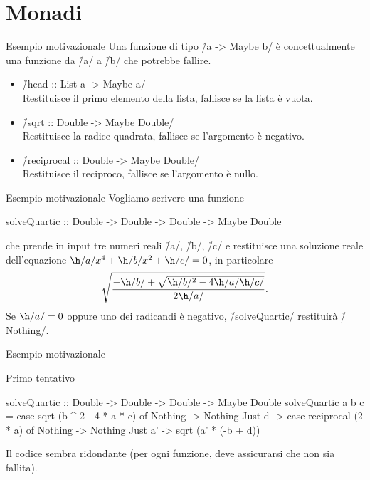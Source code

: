\section*{Monadi}

\begin{frame}[fragile]{\secname}{Esempio motivazionale}
Una funzione di tipo \h/a -> Maybe b/ è concettualmente una funzione da \h/a/ a \h/b/ che potrebbe fallire.
\pause
\begin{itemize}[<+->]
\item \h/head :: List a -> Maybe a/\\
Restituisce il primo elemento della lista, fallisce se la lista è vuota.
\item \h/sqrt :: Double -> Maybe Double/\\
Restituisce la radice quadrata, fallisce se l'argomento è negativo.
\item \h/reciprocal :: Double -> Maybe Double/\\
Restituisce il reciproco, fallisce se l'argomento è nullo.
\end{itemize}
\end{frame}

\begin{frame}[fragile]{\secname}{Esempio motivazionale}
Vogliamo scrivere una funzione

\begin{haskellcode}
solveQuartic
    :: Double -> Double -> Double -> Maybe Double
\end{haskellcode}

che prende in input tre numeri reali \h/a/, \h/b/, \h/c/ e restituisce una soluzione reale dell'equazione $\h/a/x^4+\h/b/x^2+\h/c/=0$, in particolare
\[
\sqrt{\frac{-\h/b/+\sqrt{\h/b/^2-4\h/a/\h/c/}}{2\h/a/}}.
\]
\pause
Se $\h/a/=0$ oppure uno dei radicandi è negativo, \h/solveQuartic/ restituirà \h/Nothing/.
\end{frame}

\begin{frame}[fragile]{\secname}{Esempio motivazionale}
\begin{block}{Primo tentativo}
\begin{haskellcode}
solveQuartic
    :: Double -> Double -> Double -> Maybe Double
solveQuartic a b c =
    case sqrt (b ^ 2 - 4 * a * c) of
        Nothing -> Nothing
        Just d -> case reciprocal (2 * a) of
            Nothing -> Nothing
            Just a' -> sqrt (a' * (-b + d))
\end{haskellcode}
\pause

Il codice sembra ridondante (per ogni funzione, deve assicurarsi che non sia fallita).
\end{block}
\end{frame}


